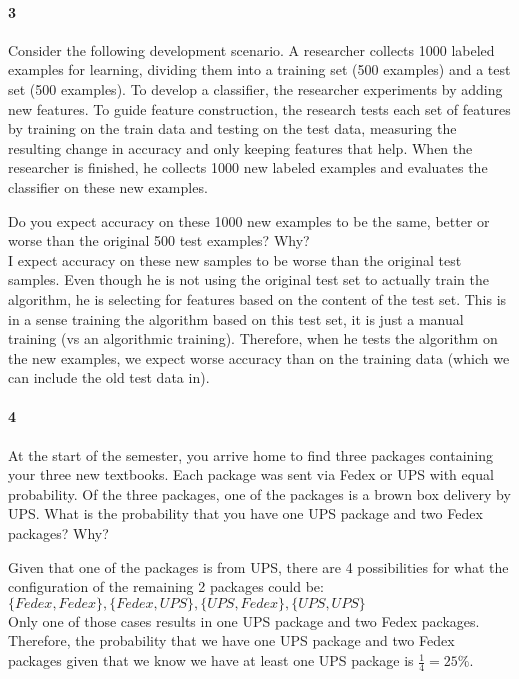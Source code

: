 \documentclass[11pt]{article}
\begin{document}
\paragraph{3} Consider the following development scenario. A researcher collects 1000
labeled examples for learning, dividing them into a training set (500 examples) and a test set (500
examples). To develop a classifier, the researcher experiments by adding new features. To guide
feature construction, the research tests each set of features by training on the train data and
testing on the test data, measuring the resulting change in accuracy and only keeping features that
help. When the researcher is finished, he collects 1000 new labeled examples and evaluates the
classifier on these new examples.

Do you expect accuracy on these 1000 new examples to be the same, better or worse than the original
500 test examples? Why?\\

I expect accuracy on these new samples to be worse than the original test samples. Even though
he is not using the original test set to actually train the algorithm, he is selecting for
features based on the content of the test set. This is in a sense training the algorithm based
on this test set, it is just a manual training (vs an algorithmic training). Therefore, when he
tests the algorithm on the new examples, we expect worse accuracy than on the training data
(which we can include the old test data in).

\paragraph{4} At the start of the semester, you arrive home to find three packages
containing your three new textbooks. Each package was sent via Fedex or UPS with equal probability.
Of the three packages, one of the packages is a brown box delivery by UPS. What is the probability
that you have one UPS package and two Fedex packages? Why?

Given that one of the packages is from UPS, there are 4 possibilities for what the configuration of
the remaining 2 packages could be:\\

$\{Fedex, Fedex\}, \{Fedex, UPS\}, \{UPS, Fedex\}, \{UPS, UPS\}$ \\
Only one of those cases results in one UPS package and two Fedex packages. Therefore, the
probability that we have one UPS package and two Fedex packages given that we know we have at least
one UPS package is $\frac{1}{4} = 25\%$.
\end{document}
